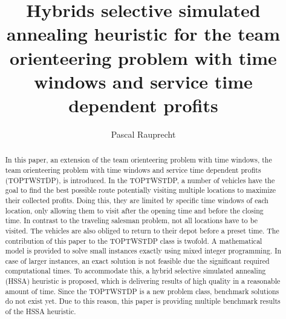 \documentclass[final,5p,times,twocolumn]{elsarticle}
\begin{document}
\begin{frontmatter}



\title{Hybrids selective simulated annealing heuristic for the team orienteering problem with time windows and service time dependent profits}


\author{Pascal Rauprecht}
\address{European University Viadrina, Frankfurt (Oder), Germany}



\begin{abstract}
In this paper, an extension of the team orienteering problem with time windows, the team orienteering problem with time windows and service time dependent profits (TOPTWSTDP), is introduced. In the TOPTWSTDP, a number of vehicles have the goal to find the best possible route potentially visiting multiple locations to maximize their collected profits. Doing this, they are limited by specific time windows of each location, only allowing them to visit after the opening time and before the closing time. In contrast to the traveling salesman problem, not all locations have to be visited. The vehicles are also obliged to return to their depot before a preset time. The contribution of this paper to the TOPTWSTDP class is twofold. A mathematical model is provided to solve small instances exactly using mixed integer programming. In case of larger instances, an exact solution is not feasible due the significant required computational times. To accommodate this, a hybrid selective simulated annealing (HSSA) heuristic is proposed, which is delivering results of high quality in a reasonable amount of time. Since the TOPTWSTDP is a new problem class, benchmark solutions do not exist yet. Due to this reason, this paper is providing multiple benchmark results of the HSSA heuristic.
\end{abstract}


\end{frontmatter}
\end{document}
